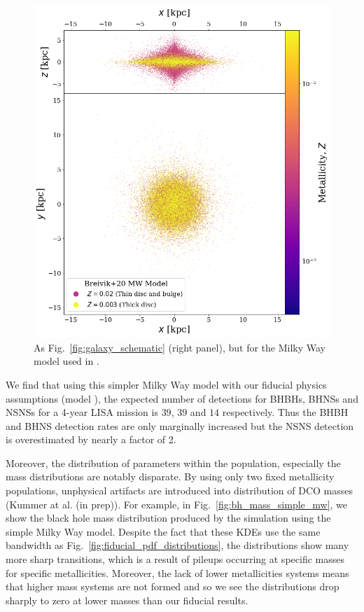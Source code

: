 \begin{figure}[ht]
    \centering
    \includegraphics[width=\columnwidth]{../figures/random_simple_galaxy.png}
    \caption{As Fig.~\ref{fig:galaxy_schematic} (right panel), but for the Milky Way model used in \citet{Breivik+2020}.}
    \label{fig:simple_mw}
\end{figure}

We find that using this simpler Milky Way model with our fiducial physics assumptions (model \modFid{}), the expected number of detections for BHBHs, BHNSs and NSNSs for a 4-year LISA mission is $39$, $39$ and $14$ respectively. Thus the BHBH and BHNS detection rates are only marginally increased but the NSNS detection is overestimated by nearly a factor of 2.

Moreover, the distribution of parameters within the population, especially the mass distributions are notably disparate. By using only two fixed metallicity populations, unphysical artifacts are introduced into distribution of DCO masses (Kummer at al. (in prep)). For example, in Fig.~\ref{fig:bh_mass_simple_mw}, we show the black hole mass distribution produced by the simulation using the simple Milky Way model. Despite the fact that these KDEs use the same bandwidth as Fig.~\ref{fig:fiducial_pdf_distributions}, the distributions show many more sharp transitions, which is a result of pileups occurring at specific masses for specific metallicities. Moreover, the lack of lower metallicities systems means that higher mass systems are not formed and so we see the distributions drop sharply to zero at lower masses than our fiducial results.

